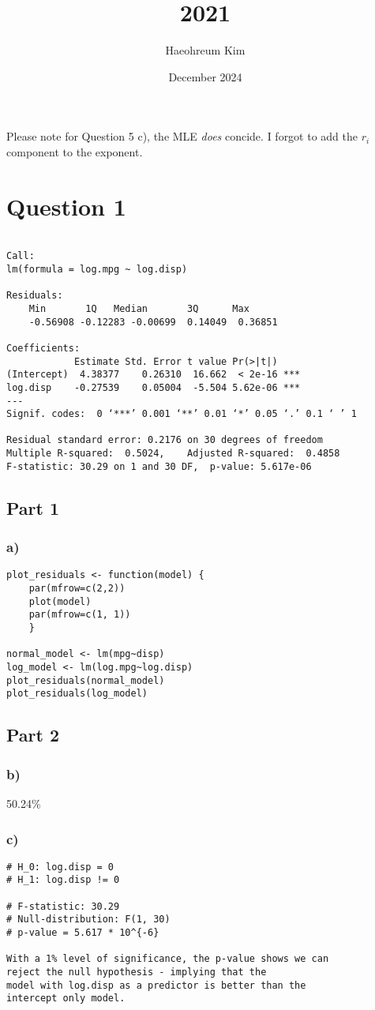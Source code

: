 \documentclass{article}
\title{2021}
\author{Haeohreum Kim}
\date{December 2024}
\begin{document}
\maketitle

Please note for Question 5 c), the MLE \textit{does} concide. I forgot to add the $r_i$ component
to the exponent.
\section*{Question 1}
\begin{verbatim}

Call:
lm(formula = log.mpg ~ log.disp)
    
Residuals:
    Min       1Q   Median       3Q      Max 
    -0.56908 -0.12283 -0.00699  0.14049  0.36851 
    
Coefficients:
            Estimate Std. Error t value Pr(>|t|)    
(Intercept)  4.38377    0.26310  16.662  < 2e-16 ***
log.disp    -0.27539    0.05004  -5.504 5.62e-06 ***
---
Signif. codes:  0 ‘***’ 0.001 ‘**’ 0.01 ‘*’ 0.05 ‘.’ 0.1 ‘ ’ 1
    
Residual standard error: 0.2176 on 30 degrees of freedom
Multiple R-squared:  0.5024,	Adjusted R-squared:  0.4858 
F-statistic: 30.29 on 1 and 30 DF,  p-value: 5.617e-06
\end{verbatim}
\subsection*{Part 1}
\subsubsection*{a)}
\begin{verbatim}
plot_residuals <- function(model) {
    par(mfrow=c(2,2))
    plot(model)
    par(mfrow=c(1, 1))
    }

normal_model <- lm(mpg~disp)
log_model <- lm(log.mpg~log.disp)
plot_residuals(normal_model)
plot_residuals(log_model)
\end{verbatim}
\subsection*{Part 2}
\subsubsection*{b)}
50.24\%
\newpage 
\subsubsection*{c)}
\begin{verbatim}
# H_0: log.disp = 0
# H_1: log.disp != 0
    
# F-statistic: 30.29
# Null-distribution: F(1, 30)
# p-value = 5.617 * 10^{-6}

With a 1% level of significance, the p-value shows we can
reject the null hypothesis - implying that the 
model with log.disp as a predictor is better than the
intercept only model. 
\end{verbatim}
\end{document}
